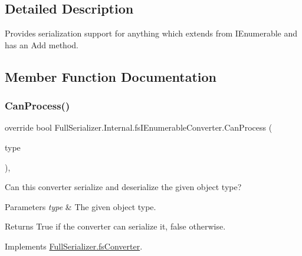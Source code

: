 \subsection{Detailed Description}
Provides serialization support for anything which extends from {\ttfamily I\+Enumerable} and has an {\ttfamily Add} method. 



\subsection{Member Function Documentation}
\mbox{\label{class_full_serializer_1_1_internal_1_1fs_i_enumerable_converter_a10f24874fda7fcb99a6a8380127dc8d0}} 
\subsubsection{\texorpdfstring{Can\+Process()}{CanProcess()}}
{\footnotesize\ttfamily override bool Full\+Serializer.\+Internal.\+fs\+I\+Enumerable\+Converter.\+Can\+Process (\begin{DoxyParamCaption}\item[{Type}]{type }\end{DoxyParamCaption})\hspace{0.3cm}{\ttfamily [inline]}, {\ttfamily [virtual]}}



Can this converter serialize and deserialize the given object type? 


\begin{DoxyParams}{Parameters}
{\em type} & The given object type.\\
\hline
\end{DoxyParams}
\begin{DoxyReturn}{Returns}
True if the converter can serialize it, false otherwise.
\end{DoxyReturn}


Implements \hyperlink{class_full_serializer_1_1fs_converter_a6d9e084c5e7f646a8d220705efaecb35}{Full\+Serializer.\+fs\+Converter}.

\mbox{\label{class_full_serializer_1_1_internal_1_1fs_i_enumerable_converter_a787950b2cb51b536dc9fc01f5870f0d9}} 
